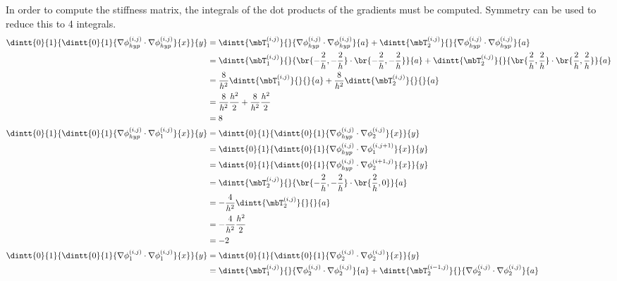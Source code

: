 \documentclass[11pt, titlepage]{article}
\begin{document}
\begin{enumerate}
\begin{enumerate}
        In order to compute the stiffness matrix, the integrals of the dot
        products of the gradients must be computed.
        Symmetry can be used to reduce this to 4 integrals.
        \begin{align*}
          \dintt{0}{1}{\dintt{0}{1}{\nabla \phi^{(i, j)}_{hyp} \cdot \nabla \phi^{(i, j)}_{hyp}}{x}}{y}
          &= \dintt{\mbT^{(i, j)}_1}{}{\nabla \phi^{(i, j)}_{hyp} \cdot \nabla \phi^{(i, j)}_{hyp}}{a}
            + \dintt{\mbT^{(i, j)}_2}{}{\nabla \phi^{(i, j)}_{hyp} \cdot \nabla \phi^{(i, j)}_{hyp}}{a} \\
          &= \dintt{\mbT^{(i, j)}_1}{}{\br{-\frac{2}{h}, -\frac{2}{h}} \cdot \br{-\frac{2}{h}, -\frac{2}{h}}}{a}
            + \dintt{\mbT^{(i, j)}_2}{}{\br{\frac{2}{h}, \frac{2}{h}} \cdot \br{\frac{2}{h}, \frac{2}{h}}}{a} \\
          &= \frac{8}{h^2}\dintt{\mbT^{(i, j)}_1}{}{}{a} + \frac{8}{h^2}\dintt{\mbT^{(i, j)}_2}{}{}{a} \\
          &= \frac{8}{h^2} \frac{h^2}{2} + \frac{8}{h^2} \frac{h^2}{2} \\
          &= 8 \\
          \dintt{0}{1}{\dintt{0}{1}{\nabla \phi^{(i, j)}_{hyp} \cdot \nabla \phi^{(i, j)}_{1}}{x}}{y}
          &= \dintt{0}{1}{\dintt{0}{1}{\nabla \phi^{(i, j)}_{hyp} \cdot \nabla \phi^{(i, j)}_{2}}{x}}{y} \\
          &= \dintt{0}{1}{\dintt{0}{1}{\nabla \phi^{(i, j)}_{hyp} \cdot \nabla \phi^{(i, j+1)}_{1}}{x}}{y} \\
          &= \dintt{0}{1}{\dintt{0}{1}{\nabla \phi^{(i, j)}_{hyp} \cdot \nabla \phi^{(i+1, j)}_{2}}{x}}{y} \\
          &= \dintt{\mbT^{(i, j)}_2}{}{\br{-\frac{2}{h}, -\frac{2}{h}} \cdot \br{\frac{2}{h}, 0}}{a} \\
          &= -\frac{4}{h^2}\dintt{\mbT^{(i, j)}_2}{}{}{a} \\
          &= -\frac{4}{h^2} \frac{h^2}{2} \\
          &= -2 \\
          \dintt{0}{1}{\dintt{0}{1}{\nabla \phi^{(i, j)}_{1} \cdot \nabla \phi^{(i, j)}_{1}}{x}}{y}
          &= \dintt{0}{1}{\dintt{0}{1}{\nabla \phi^{(i, j)}_{2} \cdot \nabla \phi^{(i, j)}_{2}}{x}}{y} \\
          &= \dintt{\mbT^{(i, j)}_1}{}{\nabla \phi^{(i, j)}_{2} \cdot \nabla \phi^{(i, j)}_{2}}{a}
            + \dintt{\mbT^{(i-1, j)}_2}{}{\nabla \phi^{(i, j)}_{2} \cdot \nabla \phi^{(i, j)}_{2}}{a}\\

\end{align*}
\end{enumerate}
\end{enumerate}
\end{document}
